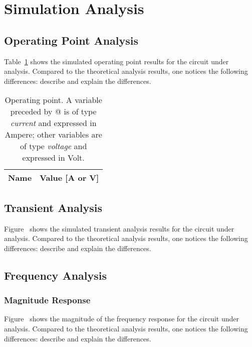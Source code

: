 \section{Simulation Analysis}
\label{sec:simulation}

\subsection{Operating Point Analysis}

Table~\ref{tab:op} shows the simulated operating point results for the circuit
under analysis. Compared to the theoretical analysis results, one notices the
following differences: describe and explain the differences.

\begin{table}[h]
  \centering
  \begin{tabular}{|l|r|}
    \hline    
    {\bf Name} & {\bf Value [A or V]} \\ \hline
    
  \end{tabular}
  \caption{Operating point. A variable preceded by @ is of type {\em current}
    and expressed in Ampere; other variables are of type {\it voltage} and expressed in
    Volt.}
  \label{tab:op}
\end{table}



\subsection{Transient Analysis}

Figure~ shows the simulated transient analysis results for the
circuit under analysis. Compared to the theoretical analysis results, one
notices the following differences: describe and explain the differences.





\subsection{Frequency Analysis}

\subsubsection{Magnitude Response}

Figure~ shows the magnitude of the frequency response for the
circuit under analysis. Compared to the theoretical analysis results, one
notices the following differences: describe and explain the differences.



